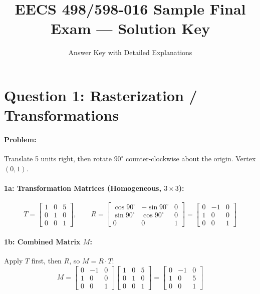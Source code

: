 \documentclass[11pt]{article}
\title{\textbf{EECS 498/598-016 Sample Final Exam --- Solution Key}}
\author{Answer Key with Detailed Explanations}
\date{}
\begin{document}
\maketitle

\section*{Question 1: Rasterization / Transformations}

\paragraph{Problem:} Translate 5 units right, then rotate $90^\circ$ counter-clockwise about the origin. Vertex $(0,1)$.

\paragraph{1a: Transformation Matrices (Homogeneous, $3\times 3$):}
\[ T = \begin{bmatrix} 1 & 0 & 5 \\ 0 & 1 & 0 \\ 0 & 0 & 1 \end{bmatrix}, \qquad R = \begin{bmatrix} \cos 90^\circ & -\sin 90^\circ & 0 \\ \sin 90^\circ & \cos 90^\circ & 0 \\ 0 & 0 & 1 \end{bmatrix} = \begin{bmatrix} 0 & -1 & 0 \\ 1 & 0 & 0 \\ 0 & 0 & 1 \end{bmatrix} \]

\paragraph{1b: Combined Matrix $M$:} Apply $T$ first, then $R$, so $M = R \cdot T$:
\[ M = \begin{bmatrix} 0 & -1 & 0 \\ 1 & 0 & 0 \\ 0 & 0 & 1 \end{bmatrix} \begin{bmatrix} 1 & 0 & 5 \\ 0 & 1 & 0 \\ 0 & 0 & 1 \end{bmatrix} = \begin{bmatrix} 0 & -1 & 0 \\ 1 & 0 & 5 \\ 0 & 0 & 1 \end{bmatrix} \]
\end{document}
